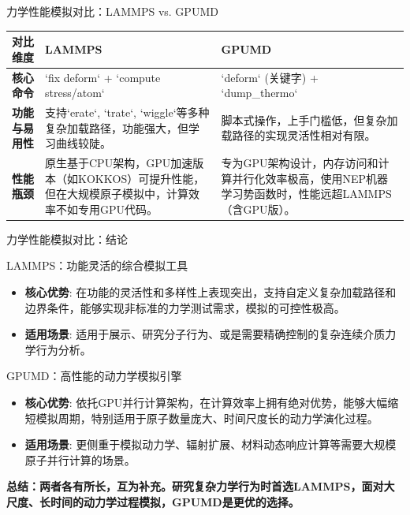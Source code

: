 \documentclass{beamer}
\begin{document}
\begin{frame}{力学性能模拟对比：LAMMPS vs. GPUMD}
    \begin{tabular}{|l|l|l|}
        \hline
        \textbf{对比维度} & \textbf{LAMMPS} & \textbf{GPUMD} \\
        \hline
        \textbf{核心命令} & `fix deform` + `compute stress/atom` & `deform` (关键字) + `dump_thermo` \\
        \hline
        \textbf{功能与易用性} & 支持`erate`, `trate`, `wiggle`等多种复杂加载路径，功能强大，但学习曲线较陡。 & 脚本式操作，上手门槛低，但复杂加载路径的实现灵活性相对有限。 \\
        \hline
        \textbf{性能瓶颈} & 原生基于CPU架构，GPU加速版本（如KOKKOS）可提升性能，但在大规模原子模拟中，计算效率不如专用GPU代码。 & 专为GPU架构设计，内存访问和计算并行化效率极高，使用NEP机器学习势函数时，性能远超LAMMPS（含GPU版）。 \\
        \hline
    \end{tabular}
\end{frame}

\begin{frame}{力学性能模拟对比：结论}
    \begin{block}{LAMMPS：功能灵活的综合模拟工具}
        \begin{itemize}
            \item \textbf{核心优势}: 在功能的灵活性和多样性上表现突出，支持自定义复杂加载路径和边界条件，能够实现非标准的力学测试需求，模拟的可控性极高。
            \item \textbf{适用场景}: 适用于展示、研究分子行为、或是需要精确控制的复杂连续介质力学行为分析。
        \end{itemize}
    \end{block}
    \begin{block}{GPUMD：高性能的动力学模拟引擎}
        \begin{itemize}
            \item \textbf{核心优势}: 依托GPU并行计算架构，在计算效率上拥有绝对优势，能够大幅缩短模拟周期，特别适用于原子数量庞大、时间尺度长的动力学演化过程。
            \item \textbf{适用场景}: 更侧重于模拟动力学、辐射扩展、材料动态响应计算等需要大规模原子并行计算的场景。
        \end{itemize}
    \end{block}
    \textbf{总结：两者各有所长，互为补充。研究复杂力学行为时首选LAMMPS，面对大尺度、长时间的动力学过程模拟，GPUMD是更优的选择。}
\end{frame}
\end{document}
